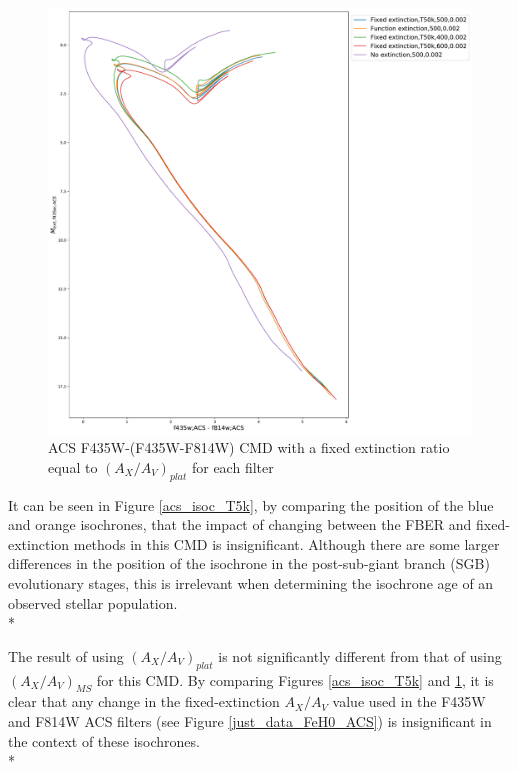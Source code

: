 \documentclass[12pt, a4paper]{report}
\begin{document}
\begin{figure}[h]
\begin{center}
\includegraphics[width=1.0\textwidth]{../basti_isochrones_10_13Gyr/Extinction_T50k_FeH0fix_func_f435wACS_f435wACSmf814wACS_500_400_600_Myr_FeH_0p002_ref_noext_Av_1p0.pdf}
\caption{ACS F435W-(F435W-F814W) CMD with a fixed extinction ratio equal to $(A_{X}/A_{V})_{plat}$ for each filter}
\label{acs_isoc_T50k}
\end{center}
\end{figure}

It can be seen in Figure \ref{acs_isoc_T5k}, by comparing the position of the blue and orange isochrones, that the impact of changing between the FBER and fixed-extinction methods in this CMD is insignificant. Although there are some larger differences in the position of the isochrone in the post-sub-giant branch (SGB) evolutionary stages, this is irrelevant when determining the isochrone age of an observed stellar population.\\*

The result of using $(A_{X}/A_{V})_{plat}$ is not significantly different from that of using $(A_{X}/A_{V})_{MS}$ for this CMD. By comparing Figures \ref{acs_isoc_T5k} and \ref{acs_isoc_T50k}, it is clear that any change in the fixed-extinction $A_{X}/A_{V}$ value used in the F435W and F814W ACS filters (see Figure \ref{just_data_FeH0_ACS}) is insignificant in the context of these isochrones.\\*
\end{document}
